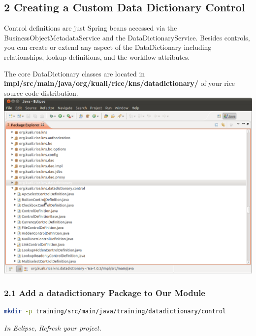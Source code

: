\subsection*{2 Creating a Custom Data Dictionary Control}
Control definitions are just Spring beans accessed via the
BusinessObjectMetadataService and the DataDictionaryService. Besides
controls, you can create or extend any aspect of the DataDictionary
including relationships, lookup definitions, and the workflow
attributes.

The core DataDictionary classes are located in
\textbf{impl/src/main/java/org/kuali/rice/kns/datadictionary/} of your
rice source code distribution.
\includegraphics[width=\textwidth]{images/Screenshot-Java - Eclipse .png}

\subsubsection*{2.1 Add a datadictionary Package to Our Module}

\begin{lstlisting}[basicstyle=\scriptsize,language=bash,backgroundcolor=\color{ubergray},caption={Directory creation for Linux
    users},frame=single,breaklines=true]
  mkdir -p training/src/main/java/training/datadictionary/control
\end{lstlisting}

\emph{In Eclipse, Refresh your project.}

